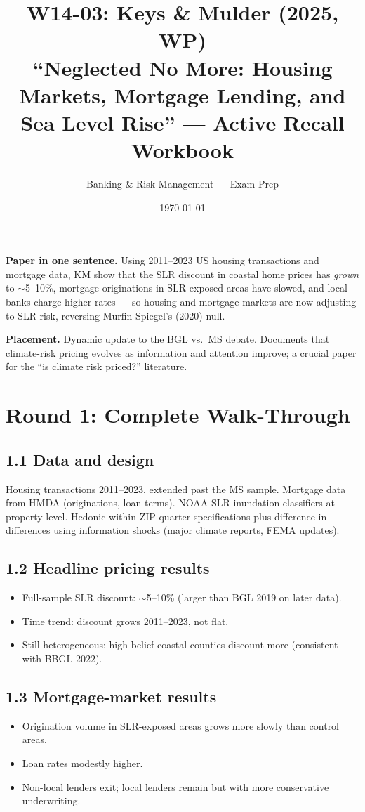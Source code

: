 \documentclass[11pt]{article}
\title{W14-03: Keys \& Mulder (2025, WP) \\
\large ``Neglected No More: Housing Markets, Mortgage Lending, and Sea Level Rise'' --- Active Recall Workbook}
\author{Banking \& Risk Management --- Exam Prep}
\date{\today}
\begin{document}
\maketitle

\begin{keybox}
\textbf{Paper in one sentence.} Using 2011--2023 US housing transactions and mortgage data, KM show that the SLR discount in coastal home prices has \emph{grown} to $\sim$5--10\%, mortgage originations in SLR-exposed areas have slowed, and local banks charge higher rates --- so housing and mortgage markets are now adjusting to SLR risk, reversing Murfin-Spiegel's (2020) null.

\textbf{Placement.} Dynamic update to the BGL vs.\ MS debate. Documents that climate-risk pricing evolves as information and attention improve; a crucial paper for the ``is climate risk priced?'' literature.
\end{keybox}

\section*{Round 1: Complete Walk-Through}

\subsection*{1.1 Data and design}
Housing transactions 2011--2023, extended past the MS sample. Mortgage data from HMDA (originations, loan terms). NOAA SLR inundation classifiers at property level. Hedonic within-ZIP-quarter specifications plus difference-in-differences using information shocks (major climate reports, FEMA updates).

\subsection*{1.2 Headline pricing results}
\begin{itemize}
\item Full-sample SLR discount: $\sim$5--10\% (larger than BGL 2019 on later data).
\item Time trend: discount grows 2011--2023, not flat.
\item Still heterogeneous: high-belief coastal counties discount more (consistent with BBGL 2022).
\end{itemize}

\subsection*{1.3 Mortgage-market results}
\begin{itemize}
\item Origination volume in SLR-exposed areas grows more slowly than control areas.
\item Loan rates modestly higher.
\item Non-local lenders exit; local lenders remain but with more conservative underwriting.
\end{itemize}
\end{document}

